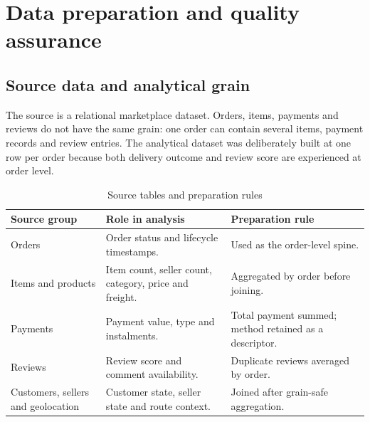 \documentclass[11pt,a4paper]{article}
\begin{document}
\section{Data preparation and quality assurance}

\subsection{Source data and analytical grain}
The source is a relational marketplace dataset. Orders, items, payments and reviews do not have the same grain: one order can contain several items, payment records and review entries. The analytical dataset was deliberately built at one row per order because both delivery outcome and review score are experienced at order level.

\begin{table}[h]
\centering
\caption{Source tables and preparation rules}
\begin{tabularx}{\textwidth}{L{3.2cm} L{4.8cm} L{5.8cm}}
\toprule
\textbf{Source group} & \textbf{Role in analysis} & \textbf{Preparation rule} \\
\midrule
Orders & Order status and lifecycle timestamps. & Used as the order-level spine. \\
Items and products & Item count, seller count, category, price and freight. & Aggregated by order before joining. \\
Payments & Payment value, type and instalments. & Total payment summed; method retained as a descriptor. \\
Reviews & Review score and comment availability. & Duplicate reviews averaged by order. \\
Customers, sellers and geolocation & Customer state, seller state and route context. & Joined after grain-safe aggregation. \\
\bottomrule
\end{tabularx}
\end{table}
\end{document}
